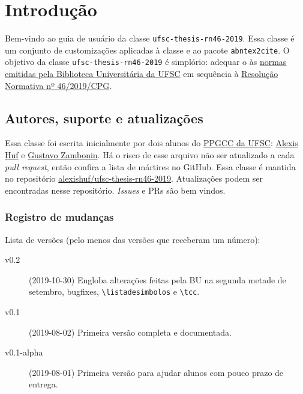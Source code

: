\documentclass[embeddedlogo]{../ufsc-thesis-rn46-2019}
\newcommand{\lacmd}[1]{\texttt{\textbackslash{}#1}}
\begin{document}
\tableofcontents*%

\textual%

\chapter{Introdução}

Bem-vindo ao guia de usuário da classe \texttt{ufsc-thesis-rn46-2019}. Essa
classe é um conjunto de customizações aplicadas à classe
\href{https://ctan.org/pkg/abntex2}{\abnTeX} e ao pacote \texttt{abntex2cite}.
O objetivo da classe \texttt{ufsc-thesis-rn46-2019} é simplório: adequar o
\abnTeX{} às \href{http://portal.bu.ufsc.br/normalizacao/}{normas emitidas pela
Biblioteca Universitária da UFSC} em sequência à
\href{https://repositorio.ufsc.br/handle/123456789/197121}{Resolução Normativa
nº 46/2019/CPG}.


\section{Autores, suporte e atualizações}

Essa classe foi escrita inicialmente por dois alunos do
\href{http://ppgcc.posgrad.ufsc.br/}{PPGCC da UFSC}:
\href{mailto:alexishuf@gmail.com}{Alexis Huf} e
\href{mailto:gustavo.zambonin@posgrad.ufsc.br}{Gustavo Zambonin}.  Há o risco de
esse arquivo não ser atualizado a cada \textit{pull request}, então confira a
lista de mártires no GitHub. Essa classe é mantida no repositório
\href{https://github.com/alexishuf/ufsc-thesis-rn46-2019/}{alexishuf/ufsc-thesis-rn46-2019}.
Atualizações podem ser encontradas nesse repositório. \textit{Issues} e PRs são
bem vindos.

\subsection{Registro de mudanças}

Lista de versões (pelo menos das versões que receberam um número):
\begin{description}
\item[v0.2] (2019-10-30) Engloba alterações feitas pela BU na segunda metade de
  setembro, bugfixes, \lacmd{listadesimbolos} e \lacmd{tcc}.
\item[v0.1] (2019-08-02) Primeira versão completa e documentada.
\item[v0.1-alpha] (2019-08-01) Primeira versão para ajudar alunos com pouco
    prazo de entrega.
\end{description}
\end{document}
